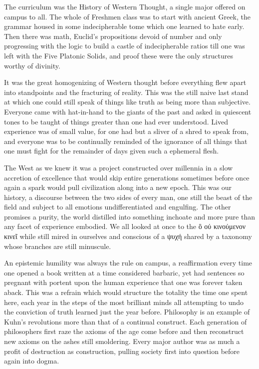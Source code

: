 \documentclass[ebook, 10pt, openright, onecolumn]{memoir}
\newcommand{\textgreek}[1]{\begingroup\fontencoding{LGR}\selectfont#1\endgroup}
\begin{document}
The curriculum was the History of Western Thought, a single major offered
on campus to all.  The whole of Freshmen class was to start with ancient Greek,
the grammar housed in some indecipherable tome which one learned to hate early.
Then there was math, Euclid's propositions devoid of number and only progressing
with the logic to build a castle of indecipherable ratios till one was left with
the Five Platonic Solids, and proof these were the only structures worthy of
divinity.  

It was the great homogenizing of Western thought before everything flew apart
into standpoints and the fracturing of reality.  This was the still naive last
stand at which one could still speak of things like truth as being more than
subjective.  Everyone came with hat-in-hand to the giants of the past and asked
in quiescent tones to be taught of things greater than one had ever understood.
Lived experience was of small value, for one had but a sliver of a shred to
speak from, and everyone was to be continually reminded of the ignorance of all
things that one must fight for the remainder of days given such a ephemeral
flesh.

The West as we knew it was a project constructed over millennia in a slow
accretion of excellence that would skip entire generations sometimes before once
again a spark would pull civilization along into a new epoch.  This was our
history, a discourse between the two sides of every man, one still the beast of
the field and subject to all emotions undifferentiated and engulfing.  The other
promises a purity, the world distilled into something inchoate and more pure
than any facet of experience embodied.  We all looked at once to the
\textgreek{ὃ οὐ κινούμενον κινεῖ} while still mired in ourselves and conscious
of a \textgreek{ψυχή} shared by a taxonomy whose branches are still minuscule. 

An epistemic humility was always the rule on campus, a reaffirmation every time
one opened a book written at a time considered barbaric, yet had sentences so
pregnant with portent upon the human experience that one was forever taken
aback.  This was a refrain which would structure the totality the time one spent
here, each year in the steps of the most brilliant minds all attempting to undo
the conviction of truth learned just the year before.  Philosophy is an example
of Kuhn's revolutions more than that of a continual construct.  Each generation
of philosophers first raze the axioms of the age come before and then
reconstruct new axioms on the ashes still smoldering.  Every major author was as
much a profit of destruction as construction, pulling society first into
question before again into dogma.
\end{document}
